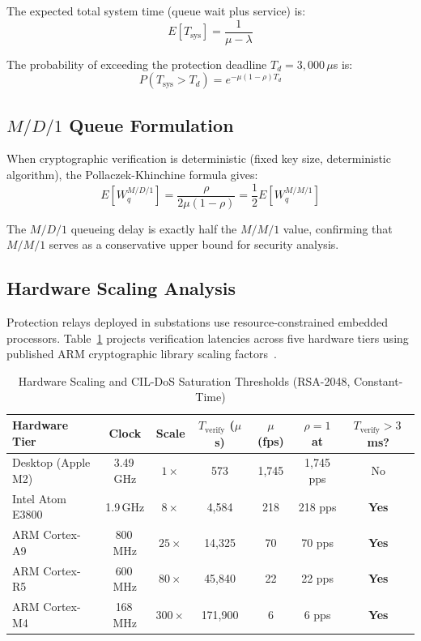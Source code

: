 \documentclass{ieeeaccess}
\begin{document}
The expected total system time (queue wait plus service) is:
\begin{equation}
E[T_{\text{sys}}] = \frac{1}{\mu - \lambda}
\end{equation}

The probability of exceeding the protection deadline $T_d = 3{,}000\,\mu$s is:
\begin{equation}
P(T_{\text{sys}} > T_d) = e^{-\mu(1-\rho)T_d}
\label{eq:viol_mm1}
\end{equation}

\subsection{$M/D/1$ Queue Formulation}
When cryptographic verification is deterministic (fixed key size, deterministic algorithm), the Pollaczek-Khinchine formula gives:
\begin{equation}
E[W_q^{M/D/1}] = \frac{\rho}{2\mu(1-\rho)} = \frac{1}{2} E[W_q^{M/M/1}]
\end{equation}

The $M/D/1$ queueing delay is exactly half the $M/M/1$ value, confirming that $M/M/1$ serves as a conservative upper bound for security analysis.

\subsection{Hardware Scaling Analysis}
Protection relays deployed in substations use resource-constrained embedded processors. Table~\ref{tab:hw_scaling} projects verification latencies across five hardware tiers using published ARM cryptographic library scaling factors~\cite{arm_cortex_m4, arm_cortex_r5, ali2020latency}.

\begin{table}[t]
\caption{Hardware Scaling and CIL-DoS Saturation Thresholds (RSA-2048, Constant-Time)}
\label{tab:hw_scaling}
\centering
\begin{tabular}{lcccccc}
\toprule
\textbf{Hardware Tier} & \textbf{Clock} & \textbf{Scale} & $T_{\text{verify}}$ ($\mu$s) & $\mu$ \textbf{(fps)} & $\rho = 1$ \textbf{at} & $T_{\text{verify}} > 3$\,ms? \\
\midrule
Desktop (Apple M2)     & 3.49\,GHz & $1\times$    & 573     & 1,745   & 1,745 pps & No \\
Intel Atom E3800       & 1.9\,GHz  & $8\times$    & 4,584   & 218     & 218 pps   & \textbf{Yes} \\
ARM Cortex-A9          & 800\,MHz  & $25\times$   & 14,325  & 70      & 70 pps    & \textbf{Yes} \\
ARM Cortex-R5          & 600\,MHz  & $80\times$   & 45,840  & 22      & 22 pps    & \textbf{Yes} \\
ARM Cortex-M4          & 168\,MHz  & $300\times$  & 171,900 & 6       & 6 pps     & \textbf{Yes} \\
\bottomrule
\end{tabular}
\end{table}
\end{document}
